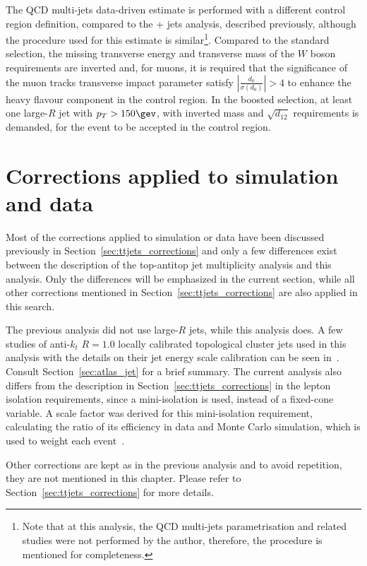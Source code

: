 The QCD multi-jets data-driven estimate is performed with a different control region definition, compared to the \ttbar + jets analysis, described previously, although
the procedure used for this estimate is similar\footnote{Note that at this analysis, the QCD multi-jets parametrisation and related studies were not performed by the author,
therefore, the procedure is mentioned for completeness.}.
Compared to the standard selection, the missing transverse energy and transverse mass of the $W$ boson requirements are
inverted and, for muons, it is required that the significance of the muon tracks transverse impact parameter satisfy $|\frac{d_0}{\sigma(d_0)}| > 4$ to enhance the heavy
flavour component in the control region.
In the boosted selection, at least one large-$R$ jet with $p_T > 150\gev$, with inverted mass and $\sqrt{d_{12}}$ requirements is demanded, for the event to be accepted
in the control region.

\section{Corrections applied to simulation and data}
\label{sec:ttbarres7_cor}

Most of the corrections applied to simulation or data have been discussed previously in Section~\ref{sec:ttjets_corrections} and only a few differences exist between
the description of the top-antitop jet multiplicity analysis and this analysis. Only the differences will be emphasized in the current section, while all other corrections
mentioned in Section~\ref{sec:ttjets_corrections} are also applied in this search.

The previous analysis did not use large-$R$ jets, while this analysis does. A few studies of anti-$k_t$ $R=1.0$ locally calibrated topological cluster jets used in this analysis
with the details on their jet energy scale calibration 
can be seen in~\cite{fatjet_confnote}. Consult Section~\ref{sec:atlas_jet} for a brief summary.
The current analysis also differs from the description in Section~\ref{sec:ttjets_corrections} in the lepton isolation requirements, since a mini-isolation is used,
instead of a fixed-cone variable. A scale factor was derived for this mini-isolation requirement, calculating the ratio of its
efficiency in data and Monte Carlo simulation, which is used to weight each event~\cite{ttres7paper}.

Other corrections are kept as in the previous analysis and to avoid repetition,
they are not mentioned in this chapter.
Please refer to Section~\ref{sec:ttjets_corrections} for more details.

